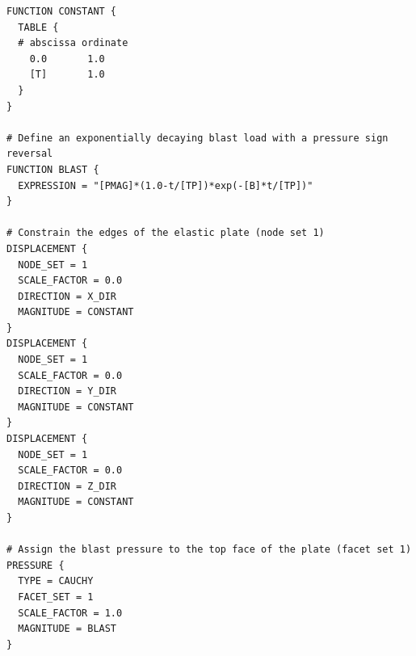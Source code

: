 \documentclass[11pt]{article} %
\begin{document}
\begin{lstlisting}[showstringspaces=false]
FUNCTION CONSTANT {
  TABLE {
  # abscissa ordinate
    0.0       1.0
    [T]       1.0
  } 
}

# Define an exponentially decaying blast load with a pressure sign reversal
FUNCTION BLAST {
  EXPRESSION = "[PMAG]*(1.0-t/[TP])*exp(-[B]*t/[TP])"
}

# Constrain the edges of the elastic plate (node set 1)
DISPLACEMENT {
  NODE_SET = 1
  SCALE_FACTOR = 0.0
  DIRECTION = X_DIR
  MAGNITUDE = CONSTANT
}
DISPLACEMENT {
  NODE_SET = 1
  SCALE_FACTOR = 0.0
  DIRECTION = Y_DIR
  MAGNITUDE = CONSTANT
}
DISPLACEMENT {
  NODE_SET = 1
  SCALE_FACTOR = 0.0
  DIRECTION = Z_DIR
  MAGNITUDE = CONSTANT
}

# Assign the blast pressure to the top face of the plate (facet set 1)
PRESSURE {
  TYPE = CAUCHY
  FACET_SET = 1
  SCALE_FACTOR = 1.0
  MAGNITUDE = BLAST
}
\end{lstlisting}

\newpage
\end{document}
